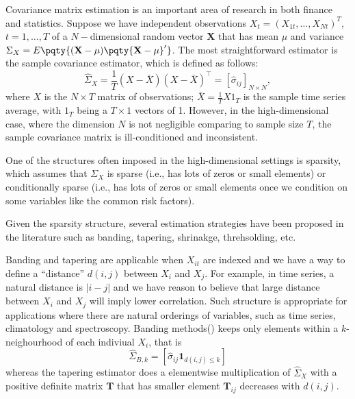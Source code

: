 Covariance matrix estimation is an important area of research in both finance and statistics. Suppose we have independent observations ${X}_{t}=(X_{1t},\dots,X_{Nt})^T$, $t=1,\dots,T$ of a $N-$dimensional random vector \(\mathbf{X}\) that has mean \(\mu\) and variance ${\Sigma}_{X} =E\pqty{(\mathbf{X} - \mu) \pqty{\mathbf{X} - \mu}'}$. The most straightforward estimator is the sample covariance estimator, which is defined as follows:
\begin{equation}
{\hat{\Sigma}_{X}}=\frac{1}{T}({X}-\bar{{X}})({X}-\bar{{X}})^{\intercal}=[\hat{\sigma}_{ij}]_{N\times N},
\end{equation}
where ${X}$ is the $N\times T$ matrix of observations; $\bar{{X}}=\frac{1}{T}{X}{1}_{T}$ is the sample time series average, with ${1}_{T}$ being a $T\times 1$ vectors of 1. However, in the high-dimensional case, where the dimension \(N\) is not negligible comparing to sample size \(T\), the sample covariance matrix is ill-conditioned and inconsistent. 

One of the structures often imposed in the high-dimensional settings is sparsity, which assumes that ${\Sigma}_{X}$ is sparse (i.e., has lots of zeros or small elements) or conditionally sparse (i.e., has lots of zeros or small elements once we condition on some variables like the common risk factors). 

Given the sparsity structure, several estimation strategies have been proposed in the literature such as banding, tapering, shrinakge, threhsolding, etc. 

Banding and tapering are applicable when $X_{it}$ are indexed and we have a way to define a ``distance'' \(d(i,j)\) between \(X_{i}\) and \(X_{j}\). For example, in time series, a natural distance is $|i-j|$ and we have reason to believe that large distance between \(X_{i}\) and \(X_{j}\) will imply lower correlation. Such structure is appropriate for applications where there are natural orderings of variables, such as time series, climatology and spectroscopy. Banding methods(\cite{bickel2008RegularizedEstimation}) keeps only elements within a \(k\)-neighourhood of each indiviual \(X_{i}\), that is 
\begin{equation*}
    \hat{\Sigma}_{B,k} = [\hat{\sigma}_{ij} \mathbf{1}_{d(i,j) \leq k}]
\end{equation*}
whereas the tapering estimator does a elementwise multiplication of \(\hat{\Sigma}_{X}\) with a positive definite matrix \(\mathbf{T}\) that has smaller element \(\mathbf{T}_{ij}\) decreases with \(d(i,j)\). 

